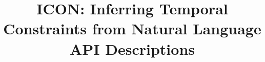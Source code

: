\documentclass{sig-alternate}
\begin{document}
%

\title{{\ttlit ICON}: {\ttlit I}nferring Temporal {\ttlit Con}straints from Natural Language API Descriptions}
%
%
%
%
%
\end{document}
